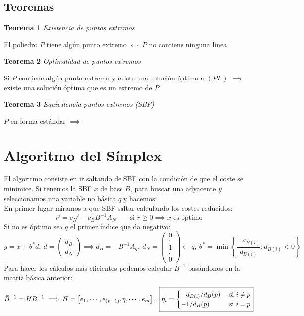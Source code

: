 \documentclass{myclass}
\begin{document}
\subsection{Teoremas}
\textbf{Teorema 1} \textit{Existencia de puntos extremos}
\begin{center}
    El poliedro $P$ tiene algún punto extremo $\iff$ $P$ no contiene ninguna línea
\end{center}
\textbf{Teorema 2} \textit{Optimalidad de puntos extremos}
\begin{center}
    Si $P$ contiene algún punto extremo y existe una solución óptima a $(PL)$ $\implies$ existe una solución óptima que es un extremo de $P$
\end{center}
\textbf{Teorema 3} \textit{Equivalencia puntos extremos (SBF)}
\begin{center}
    $P$ en forma estándar $\implies$ 
\end{center}

\section{Algoritmo del Símplex}
El algoritmo consiste en ir saltando de SBF con la condición de que el coste se minimice. Si tenemos la SBF $x$ de base $B$, para buscar una adyacente $y$ seleccionamos una variable no básica $q$ y hacemos: \\
En primer lugar miramos a que SBF saltar calculando los costes reducidos:
$$
\boxed{r' = c_N' - c_BB^{-1}A_N} \qquad \text{si } r\geq 0 \implies x \text{ es óptimo}
$$
Si no es óptimo sea $q$ el primer índice que da negativo:
$$
y = x + \theta^*d, \
d = \begin{pmatrix}
d_B \\
d_N
\end{pmatrix} \implies 
\boxed{d_B = -B^{-1}A_q}, \ \boxed{d_N = \begin{pmatrix}
0 \\
. \\
1 \\
. \\
0 
\end{pmatrix} \leftarrow q}, \
\boxed{\theta^* = \min \left\lbrace\frac{-x_{B(i)}}{d_{B(i)}}:d_{B(i)}<0  \right\rbrace}
$$
Para hacer los cálculos más eficientes podemos calcular $B^{-1}$ basándonos en la matriz básica anterior:
$$
 \Bar{B}^{-1} = HB^{-1} \implies
H=\left[ e_1, \cdots, e_{(p-1)}, \eta, \cdots, e_m  \right], \ \boxed{\eta_i = \begin{cases}
    -d_{B(i)}/d_B(p) &\text{ si } i\neq p \\
    -1/d_B(p) &\text{ si } i = p
\end{cases}}
$$
\end{document}
